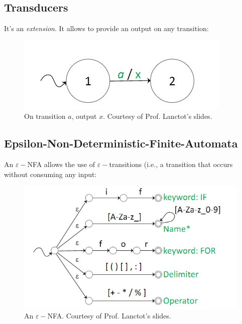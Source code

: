 \documentclass{report}
\begin{document}
\subsection{Transducers}
It's an \textit{extension}. It allows to provide an output on any transition:
\begin{figure}[ht]
\begin{center}
\includegraphics[scale=0.6]{transducer.jpg}
\end{center}
\caption{On transition $a$, output $x$. Courtesy of Prof. Lanctot's slides.}
\end{figure}
\subsection{Epsilon-Non-Deterministic-Finite-Automata}
An $\varepsilon-$NFA allows the use of $\varepsilon-$transitions (i.e., a transition that occurs without consuming any input:
\begin{figure}[ht]
\begin{center}
\includegraphics[scale=0.6]{enfa.jpg}
\end{center}
\caption{An $\varepsilon-$NFA. Courtesy of Prof. Lanctot's slides.}
\end{figure}

\end{document}
